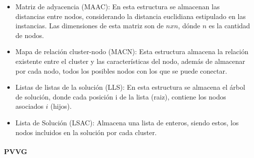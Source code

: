 \begin{itemize}
\item Matriz de adyacencia (MAAC): En esta estructura se almacenan las distancias entre nodos, considerando la distancia euclidiana estipulado en las instancias. Las dimensiones de esta matriz son de $n x n$, dónde $n$ es la cantidad de nodos.

\item Mapa de relación cluster-nodo (MACN): Esta estructura almacena la relación existente entre el cluster y las características del nodo, además de almacenar por cada nodo, todos los posibles nodos con los que se puede conectar.

\item Listas de listas de la solución (LLS): En esta estructura se almacena el árbol de solución, donde cada posición i de la lista (raiz), contiene los nodos asociados $i$ (hijos).

\item Lista de Solución (LSAC): Almacena una lista de enteros, siendo estos, los nodos incluidos en la solución por cada cluster.

\end{itemize}	
	
\paragraph{PVVG}

